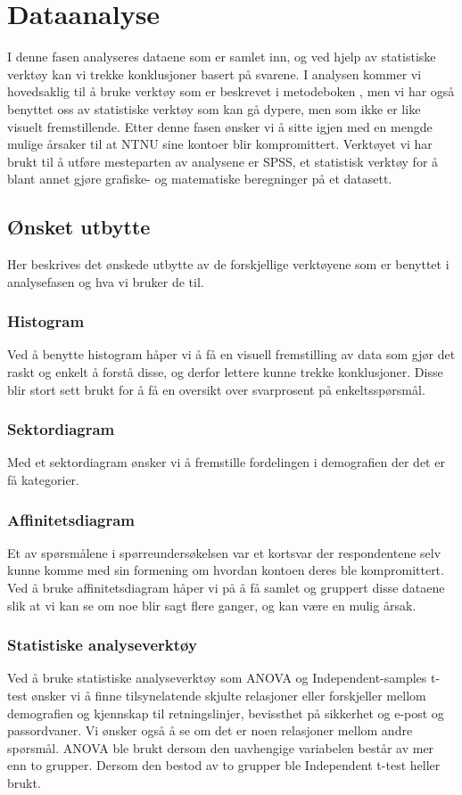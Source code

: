 \chapter{Dataanalyse}
I denne fasen analyseres dataene som er samlet inn, og ved hjelp av statistiske verktøy kan vi trekke konklusjoner basert på svarene. I analysen kommer vi hovedsaklig til å bruke verktøy som er beskrevet i metodeboken \cite{RCA}, men vi har også benyttet oss av statistiske verktøy som kan gå dypere, men som ikke er like visuelt fremstillende. Etter denne fasen ønsker vi å sitte igjen med en mengde mulige årsaker til at NTNU sine kontoer blir kompromittert. Verktøyet vi har brukt til å utføre mesteparten av analysene er SPSS, et statistisk verktøy for å blant annet gjøre grafiske- og matematiske beregninger på et datasett.

\section{Ønsket utbytte}
Her beskrives det ønskede utbytte av de forskjellige verktøyene som er benyttet i analysefasen og hva vi bruker de til.

\subsection{Histogram}
Ved å benytte histogram håper vi å få en visuell fremstilling av data som gjør det raskt og enkelt å forstå disse, og derfor lettere kunne trekke konklusjoner. Disse blir stort sett brukt for å få en oversikt over svarprosent på enkeltsspørsmål. 

\subsection{Sektordiagram}
Med et sektordiagram ønsker vi å fremstille fordelingen i demografien der det er få kategorier. 

\subsection{Affinitetsdiagram}
Et av spørsmålene i spørreundersøkelsen var et kortsvar der respondentene selv kunne komme med sin formening om hvordan kontoen deres ble kompromittert. Ved å bruke affinitetsdiagram håper vi på å få samlet og gruppert disse dataene slik at vi kan se om noe blir sagt flere ganger, og kan være en mulig årsak. 

\subsection{Statistiske analyseverktøy}
Ved å bruke statistiske analyseverktøy som ANOVA og Independent-samples t-test ønsker vi å finne tilsynelatende skjulte relasjoner eller forskjeller mellom demografien og kjennskap til retningslinjer, bevissthet på sikkerhet og e-post og passordvaner. Vi ønsker også å se om det er noen relasjoner mellom andre spørsmål. ANOVA ble brukt dersom den uavhengige variabelen består av mer enn to grupper. Dersom den bestod av to grupper ble Independent t-test heller brukt.

